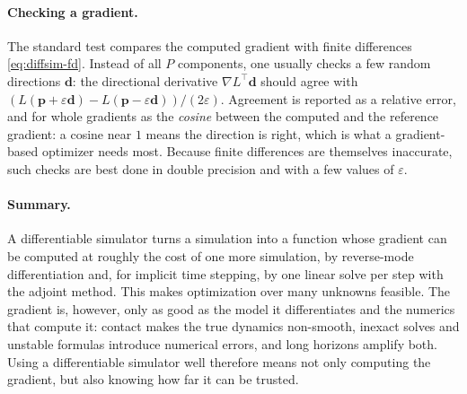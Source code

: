 \paragraph{Checking a gradient.}
The standard test compares the computed gradient with finite differences
\eqref{eq:diffsim-fd}. Instead of all $P$ components, one usually checks a
few random directions $\mathbf{d}$: the directional derivative
$\nabla L^\top \mathbf{d}$ should agree with
$\left(L(\mathbf{p} + \varepsilon\mathbf{d}) - L(\mathbf{p} - \varepsilon\mathbf{d})\right)/(2\varepsilon)$.
Agreement is reported as a relative error, and for whole gradients as the
\emph{cosine} between the computed and the reference gradient: a cosine
near $1$ means the direction is right, which is what a gradient-based
optimizer needs most. Because finite differences are themselves
inaccurate, such checks are best done in double precision and with a few
values of $\varepsilon$.

\paragraph{Summary.}
A differentiable simulator turns a simulation into a function whose
gradient can be computed at roughly the cost of one more simulation, by
reverse-mode differentiation and, for implicit time stepping, by one
linear solve per step with the adjoint method. This makes optimization
over many unknowns feasible. The gradient is, however, only as good as the
model it differentiates and the numerics that compute it: contact makes
the true dynamics non-smooth, inexact solves and unstable formulas
introduce numerical errors, and long horizons amplify both. Using a
differentiable simulator well therefore means not only computing the
gradient, but also knowing how far it can be trusted.
